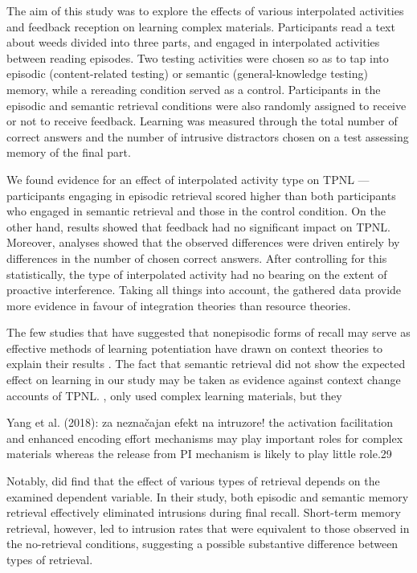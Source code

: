 \documentclass[../main.tex]{subfiles}
\begin{document}
The aim of this study was to explore the effects of various interpolated activities
and feedback reception on learning complex materials. Participants read a text
about weeds divided into three parts, and engaged in interpolated activities between
reading episodes. Two testing activities were chosen so as to tap into episodic 
(content-related testing) or semantic (general-knowledge testing) memory, while a 
rereading condition served as a control. Participants in the episodic and semantic
retrieval conditions were also randomly assigned to receive or not to receive 
feedback. Learning was measured through the total number of correct answers 
and the number of intrusive distractors chosen on a test assessing memory of the
final part.

We found evidence for an effect of interpolated activity type on TPNL --- participants 
engaging in episodic retrieval scored higher than both participants who engaged in 
semantic retrieval and those in the control condition. On the other hand, results 
showed that feedback had no significant impact on TPNL. Moreover, analyses showed
that the observed differences were driven entirely by differences in the number of
chosen correct answers. After controlling for this statistically, the type of 
interpolated activity had no bearing on the extent of proactive interference.
Taking all things into account, the gathered data provide more evidence in
favour of integration theories than resource theories. 

The few studies that have suggested that nonepisodic forms of recall may serve
as effective methods of learning potentiation have drawn on context theories to
explain their results \citep{divisRetrievalSpeedsContext2014, pastotterRetrievalLearningFacilitates2011}.
The fact that semantic retrieval did not show the expected effect on learning
in our study may be taken as evidence against context change accounts of TPNL.
, only \cite{divisRetrievalSpeedsContext2014} used complex learning materials,
but they 


Yang et al. (2018): za neznačajan efekt na intruzore!
the activation facilitation and enhanced encoding effort mechanisms may play
important roles for complex materials whereas the release from PI
mechanism is likely to play little role.29


Notably, \cite{pastotterRetrievalLearningFacilitates2011} did find that the effect
of various types of retrieval depends on the examined dependent variable. In their
study, both episodic and semantic memory retrieval effectively eliminated intrusions
during final recall. Short-term memory retrieval, however, led to intrusion rates 
that were equivalent to those observed in the no-retrieval conditions, suggesting
a possible substantive difference between types of retrieval.
\end{document}
